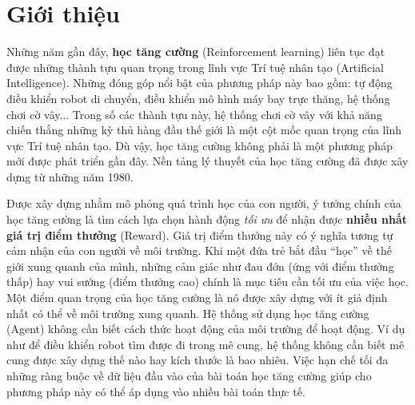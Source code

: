 \chapter{Giới thiệu}

\ifpdf
\graphicspath{{Chapter1/Chapter1Figs/PNG/}{Chapter1/Chapter1Figs/PDF/}{Chapter1/Chapter1Figs/}}
\else
\graphicspath{{Chapter1/Chapter1Figs/EPS/}{Chapter1/Chapter1Figs/}}
\fi

Những năm gần đây, \textbf{học tăng cường} (Reinforcement learning) liên tục đạt được những thành tựu quan trọng trong lĩnh vực Trí tuệ nhân tạo (Artificial Intelligence). Những đóng góp nổi bật của phương pháp này bao gồm: tự động điều khiển robot di chuyển, điều khiển mô hình máy bay trực thăng, hệ thống chơi cờ vây... Trong số các thành tựu này, hệ thống chơi cờ vây với khả năng chiến thắng những kỳ thủ hàng đầu thế giới là một cột mốc quan trọng của lĩnh vực Trí tuệ nhân tạo. Dù vậy, học tăng cường không phải là một phương pháp mới được phát triển gần đây. Nền tảng lý thuyết của học tăng cường đã được xây dựng từ những năm 1980. 

Được xây dựng nhằm mô phỏng quá trình học của con người, ý tưởng chính của học tăng cường là tìm cách lựa chọn hành động \textit{tối ưu} để nhận được \textbf{nhiều nhất giá trị điểm thưởng} (Reward). Giá trị điểm thưởng này có ý nghĩa tương tự cảm nhận của con người về môi trường. Khi một đứa trẻ bắt đầu ``học'' về thế giới xung quanh của mình, những cảm giác như đau đớn (ứng với điểm thưởng thấp) hay vui sướng (điểm thưởng cao) chính là mục tiêu cần tối ưu của việc học. Một điểm quan trọng của học tăng cường là nó được xây dựng với ít giả định nhất có thể về môi trường xung quanh. Hệ thống sử dụng học tăng cường (Agent) không cần biết cách thức hoạt động của môi trường để hoạt động. Ví dụ như để điều khiển robot tìm được đi trong mê cung, hệ thống không cần biết mê cung được xây dựng thế nào hay kích thước là bao nhiêu. Việc hạn chế tối đa những ràng buộc về dữ liệu đầu vào của bài toán học tăng cường giúp cho phương pháp này có thể áp dụng vào nhiều bài toán thực tế.

